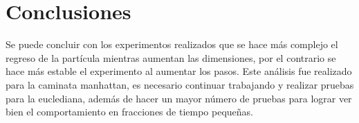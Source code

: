 \documentclass{article}
\begin{document}
\section{Conclusiones}
Se puede concluir con los experimentos realizados que se hace más complejo el regreso de la partícula mientras aumentan las dimensiones, por el contrario se hace más estable el experimento al aumentar los pasos. Este análisis fue realizado para la caminata manhattan, es necesario continuar trabajando y realizar pruebas para la euclediana, además de hacer un mayor número de pruebas para lograr ver bien el comportamiento en fracciones de tiempo pequeñas. 
\end{document}
